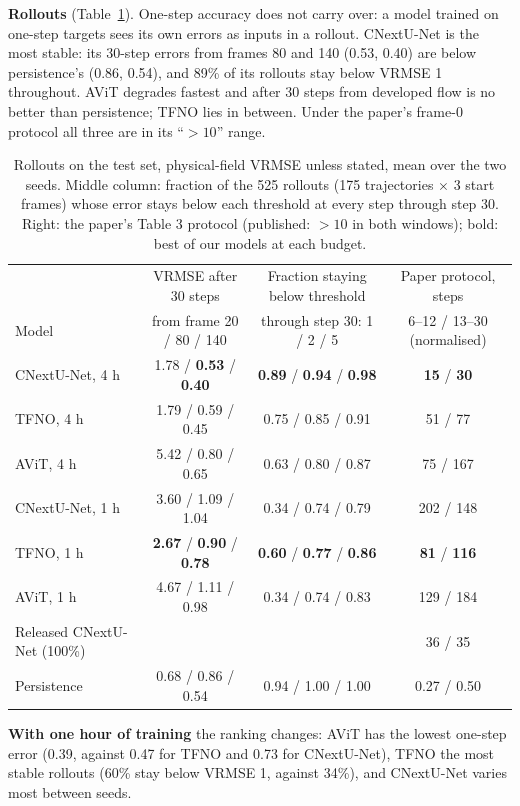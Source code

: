 \documentclass[11pt]{article}
\begin{document}
\textbf{Rollouts} (Table~\ref{tab:rollout}). One-step accuracy does not carry over: a model trained on one-step
targets sees its own errors as inputs in a rollout. CNextU-Net is the most stable: its 30-step errors from frames 80
and 140 (0.53, 0.40) are below persistence's (0.86, 0.54), and 89\% of its rollouts stay below VRMSE 1 throughout.
AViT degrades fastest and after 30 steps from developed flow is no better than persistence; TFNO lies in between.
Under the paper's frame-0 protocol all three are in its ``$>10$'' range.

\begin{table}[!htbp]
\centering\footnotesize
\begin{tabular}{@{}lccc@{}}
\toprule
& VRMSE after 30 steps & Fraction staying below threshold & Paper protocol, steps \\
Model & from frame 20 / 80 / 140 & through step 30: 1 / 2 / 5 & 6--12 / 13--30 (normalised) \\
\midrule
CNextU-Net, 4 h & 1.78 / \textbf{0.53} / \textbf{0.40} & \textbf{0.89} / \textbf{0.94} / \textbf{0.98} & \textbf{15} / \textbf{30} \\
TFNO, 4 h & 1.79 / 0.59 / 0.45 & 0.75 / 0.85 / 0.91 & 51 / 77 \\
AViT, 4 h & 5.42 / 0.80 / 0.65 & 0.63 / 0.80 / 0.87 & 75 / 167 \\
\midrule
CNextU-Net, 1 h & 3.60 / 1.09 / 1.04 & 0.34 / 0.74 / 0.79 & 202 / 148 \\
TFNO, 1 h & \textbf{2.67} / \textbf{0.90} / \textbf{0.78} & \textbf{0.60} / \textbf{0.77} / \textbf{0.86} & \textbf{81} / \textbf{116} \\
AViT, 1 h & 4.67 / 1.11 / 0.98 & 0.34 / 0.74 / 0.83 & 129 / 184 \\
\midrule
Released CNextU-Net (100\%) & & & 36 / 35 \\
Persistence & 0.68 / 0.86 / 0.54 & 0.94 / 1.00 / 1.00 & 0.27 / 0.50 \\
\bottomrule
\end{tabular}
\caption{Rollouts on the test set, physical-field VRMSE unless stated, mean over the two seeds. Middle column:
fraction of the 525 rollouts (175 trajectories $\times$ 3 start frames) whose error stays below each threshold at
every step through step 30. Right: the paper's Table 3 protocol (published: $>10$ in both windows); bold: best of
our models at each budget.}
\label{tab:rollout}
\end{table}

\textbf{With one hour of training} the ranking changes: AViT has the lowest one-step error (0.39, against 0.47 for
TFNO and 0.73 for CNextU-Net), TFNO the most stable rollouts (60\% stay below VRMSE 1, against 34\%), and
CNextU-Net varies most between seeds.
\end{document}
